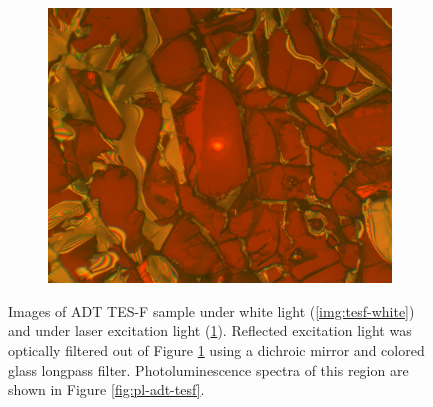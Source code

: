 \begin{figure}[H]
\begin{subfigure}[b]{0.45\textwidth}
        \includegraphics[width=\textwidth]{./img/tesf-laser-illum.png}
        \caption{}
        \label{img:tesf-laser}
    \end{subfigure}
    \caption[Images of ADT TES-F sample under white light and under laser excitation light.]{Images of ADT TES-F sample under white light (\ref{img:tesf-white}) and under laser excitation light (\ref{img:tesf-laser}). Reflected excitation light was optically filtered out of Figure \ref{img:tesf-laser} using a dichroic mirror and colored glass longpass filter. Photoluminescence spectra of this region are shown in Figure \ref{fig:pl-adt-tesf}.}
    \label{img:tesf}
\end{figure}

